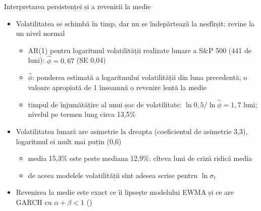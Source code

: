 \begin{frame}{Interpretarea persistenței și a revenirii la medie}
\itemsize{\small}
\begin{itemize}
    \item Volatilitatea se schimbă în timp, dar nu se îndepărtează la nesfîrșit: revine la un nivel normal 
    \begin{itemize}
        \item AR(1) pentru logaritmul volatilității realizate lunare a S\&P 500 (441 de luni): $\hat\phi = 0{,}67$ (SE 0{,}04)
        \item $\hat\phi$: ponderea estimată a logaritmului volatilității din luna precedentă; o valoare apropiată de 1 înseamnă o revenire lentă la medie
        \item timpul de înjumătățire al unui șoc de volatilitate: $\ln 0{,}5/\ln\hat\phi = 1{,}7$ luni; nivelul pe termen lung circa 13{,}5\%
    \end{itemize}
    \item Volatilitatea lunară are asimetrie la dreapta (coeficientul de asimetrie 3{,}3), logaritmul ei mult mai puțin (0{,}6) 
    \begin{itemize}
        \item media 15{,}3\% este peste mediana 12{,}9\%: cîteva luni de criză ridică media
        \item de aceea modelele volatilității sînt adesea scrise pentru $\ln\sigma_t$
    \end{itemize}
    \item Revenirea la medie este exact ce îi lipsește modelului EWMA și ce are GARCH cu $\alpha + \beta < 1$ ()
\end{itemize}
\end{frame}

